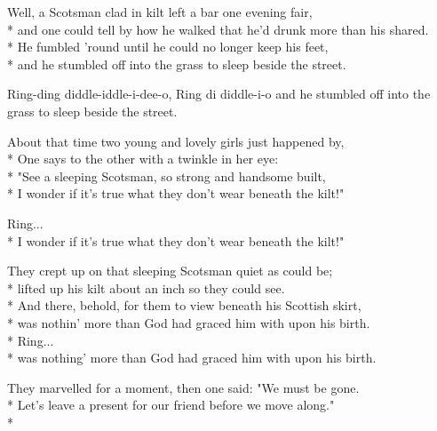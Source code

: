 \begin{SongText}
    \begin{SongVerse}
        Well, a Scotsman clad in kilt left a bar one evening fair,\\*%
        and one could tell by how he walked that he'd drunk more than his shared.\\*%
        He fumbled 'round until he could no longer keep his feet,\\*%
        and he stumbled off into the grass to sleep beside the street.
    \end{SongVerse}
    \begin{SongVerse}
        Ring-ding diddle-iddle-i-dee-o, Ring di diddle-i-o
        and he stumbled off into the grass to sleep beside the street.
    \end{SongVerse}
    \begin{SongVerse}
        About that time two young and lovely girls just happened by,\\*%
        One says to the other with a twinkle in her eye:\\*%
        "See a sleeping Scotsman, so strong and handsome built,\\*%
        I wonder if it's true what they don't wear beneath the kilt!"
    \end{SongVerse}
    \begin{SongVerse}
        Ring...\\*%
        I wonder if it's true what they don't wear beneath the kilt!"
    \end{SongVerse}
    \begin{SongVerse}
        They crept up on that sleeping Scotsman quiet as could be;\\*%
        lifted up his kilt about an inch so they could see.\\*%
        And there, behold, for them to view beneath his Scottish skirt,\\*%
        was nothin' more than God had graced him with upon his birth. \\*%
        Ring...\\*%
        was nothing' more than God had graced him with upon his birth.
    \end{SongVerse}
    \begin{SongVerse}
        They marvelled for a moment, then one said: "We must be gone.\\*%
        Let's leave a present for our friend before we move along."\\*%

\end{SongVerse}
\end{SongText}
